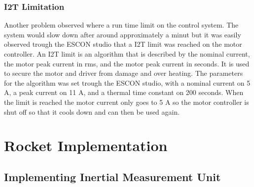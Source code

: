 \subsubsection{I2T Limitation}
Another problem observed where a run time limit on the control system. The system would slow down after around approximately a minut but it was easily observed trough the ESCON studio that a I2T limit was reached on the motor controller. An I2T limit is an algorithm that is described by the nominal current, the motor peak current in rms, and the motor peak current in seconds. It is used to secure the motor and driver from damage and over heating. The parameters for the algorithm was set trough the ESCON studio, with a nominal current on 5 A, a peak current on 11 A, and a thermal time constant on 200 seconds. When the limit is reached the motor current only goes to 5 A so the motor controller is shut off so that it cools down and can then be used again.  


\section{Rocket Implementation}

\subsection{Implementing Inertial Measurement Unit}

